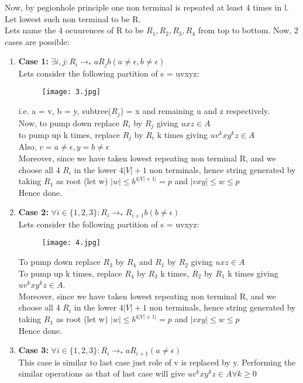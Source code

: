 \documentclass{article}
\begin{document}
Now, by pegionhole principle one non terminal is repeated at least 4 times in l. Let lowest such non terminal to be R.\\
Lets name the 4 ocuurences of R to be $R_1, R_2, R_3, R_4$ from top to bottom.
Now, 2 cases are possible:\\


\begin{enumerate}
    \item \textbf{Case 1: } $\exists i,j : R_i \rightarrow_* aR_jb (a \neq \epsilon, b \neq \epsilon)$ \\ 
    Lets consider the following partition of s = uvxyz:

    \begin{figure}[H]
        \centering
        \texttt{[image: 3.jpg]}
    \end{figure}

    i.e. a = v, b = y, subtree($R_j$) = x and remaining u and z respectively.\\
    Now, to pump down replace $R_i$ by $R_j$ giving $uxz \in A$\\
    to pump up k times, replace $R_j $ by $R_i$ k times giving $uv^kxy^kz \in A$\\
    Also, $v=a \neq \epsilon, y=b \neq \epsilon$ \\
    Moreover, since we have taken lowest repeating non terminal R, and we choose all 4 $R_i$ in the lower $4|V| + 1$ non terminals, hence string generated by 
    taking $R_1$ as root (let w) $|w| \leq b^{4|V| + 1|} = p$ and $|vxy| \leq w \leq p$\\  
    Hence done. 
    
    \item \textbf{Case 2: }$\forall i \in \{1,2,3\} : R_i \rightarrow_* R_{i+1}b (b \neq \epsilon)$\\
    Lets consider the following partition of s = uvxyz:
    \begin{figure}[H]
        \centering
        \texttt{[image: 4.jpg]}
    \end{figure}
    To pump down replace $R_3 $ by $R_4$ and $R_1$ by $R_2$ giving $uxz \in A$\\
    To pump up k times, replace $R_4$ by $R_3$ k times, $R_2$ by $R_1$ k times giving $uv^kxy^kz \in A$.\\
    Moreover, since we have taken lowest repeating non terminal R, and we choose all 4 $R_i$ in the lower $4|V| + 1$ non terminals, hence string generated by 
    taking $R_1$ as root (let w) $|w| \leq b^{4|V| + 1|} = p$ and $|vxy| \leq w \leq p$\\  
    Hence done. 

    \item \textbf{Case 3: }$\forall i \in \{1,2,3\} : R_i \rightarrow_* aR_{i+1} (a \neq \epsilon)$\\
    This case is similar to last case just role of v is replaced by y. Performing the similar operations as that of  
    last case will give $uv^kxy^kz \in A \forall k \geq 0$\\
\end{enumerate}
\end{document}
